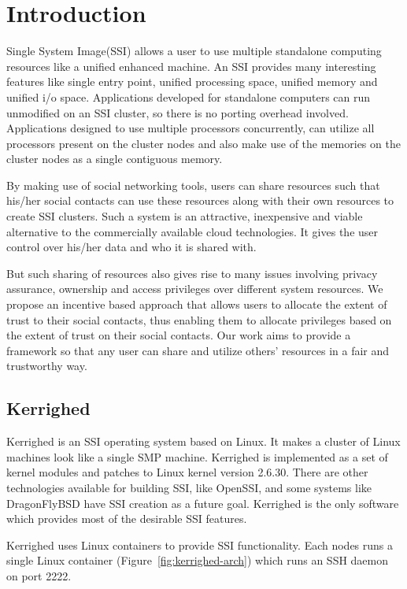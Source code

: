 \documentclass[10pt, conference, compsocconf]{IEEEtran}
\begin{document}
\section{Introduction}
\label{sec:Introduction}
Single System Image(SSI)\cite{buyya} allows a user to use multiple
standalone computing resources like a unified enhanced machine.
An SSI provides many interesting features like single
entry point, unified processing space, unified memory
and unified i/o space. Applications developed for 
standalone computers can run unmodified on an SSI cluster,
so there is no porting overhead involved. Applications
designed to use multiple processors concurrently,
can utilize all processors present on the cluster
nodes and also make use of the memories on the cluster nodes as
a single contiguous memory.

By making use of social networking tools, users can share
resources such that his/her social contacts can use these
resources along with their own resources to create SSI
clusters. Such a system is an attractive, inexpensive
and viable alternative to the commercially available cloud
technologies. It gives the user control over his/her data
and who it is shared with.

But such sharing of resources also gives rise to many issues
involving privacy assurance, ownership and access
privileges over different system resources. We propose
an incentive based approach that allows users to allocate
the extent of trust to their social contacts, thus
enabling them to allocate privileges based on the extent
of trust on their social contacts. Our work aims to
provide a framework so that any user can share and utilize others'
resources in a fair and trustworthy way.

\subsection{Kerrighed}
Kerrighed\cite{kerrighed} is an SSI operating system based on
Linux\cite{linux}. It makes a cluster of Linux machines look
like a single SMP machine. Kerrighed is implemented as a set
of kernel modules and patches to Linux kernel version 2.6.30.
There are other technologies available for building SSI, like
OpenSSI\cite{openssi}, and some systems like
DragonFlyBSD\cite{dragonflybsd} have SSI creation
as a future goal. Kerrighed is the only software which provides
most of the desirable SSI features.

Kerrighed uses Linux containers\cite{lxc} to provide SSI
functionality. Each nodes runs a single Linux container
(Figure~\ref{fig:kerrighed-arch}) which runs an SSH\cite{openssh}
daemon on port 2222.
\end{document}
